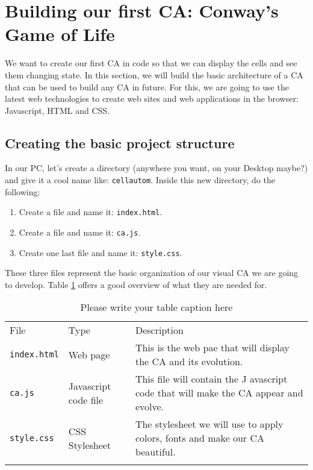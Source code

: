 
\section{Building our first CA: Conway's Game of Life}
\label{sec:simpleca}

We want to create our first CA in code so that we can display the cells and see them changing
state. In this section, we will build the basic architecture of a CA that can be used to build any
CA in future. For this, we are going to use the latest web technologies to create web sites and
web applications in the browser: Javascript, HTML and CSS.

\subsection{Creating the basic project structure}
In our PC, let's create a directory (anywhere you want, on your Desktop maybe?) and give it
a cool name like: \texttt{cellautom}. Inside this new directory, do the following:

\begin{enumerate}
\item Create a file and name it: \texttt{index.html}.
\item Create a file and name it: \texttt{ca.js}.
\item Create one last file and name it: \texttt{style.css}.
\end{enumerate}

These three files represent the basic organization of our visual CA we are going to develop.
Table \ref{tab:files} offers a good overview of what they are needed for.

%
%
\begin{table}[!t]
\centering
\caption{Please write your table caption here}
\label{tab:files}
%
%
\begin{tabular}{p{}p{}p{}}
\hline\noalign{\smallskip}
File & Type & Description \\
\noalign{\smallskip}\svhline\noalign{\smallskip}
\texttt{index.html} & Web page & This is the web pae that will display the CA and its evolution.\\
\texttt{ca.js} & Javascript code file  & This file will contain the J
    avascript code that will make the CA appear and evolve.\\
\texttt{style.css} & CSS Stylesheet  & The stylesheet we will use to apply colors, fonts 
    and make our CA beautiful.\\
\noalign{\smallskip}\hline\noalign{\smallskip}
\end{tabular}
\end{table}
%

